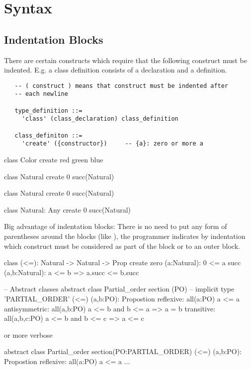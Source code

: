 \section{Syntax}

\subsection{Indentation Blocks}

There are certain constructs which require that the following construct must
be indented. E.g. a class definition consists of a declaration and a
definition.

{\small
\begin{verbatim}
   -- ( construct ) means that construct must be indented after
   -- each newline

   type_definition ::=
     'class' (class_declaration) class_definition

   class_definiton ::=
     'create' ({constructor})     -- {a}: zero or more a
\end{verbatim}
}


\begin{alba}
  class Color create red green blue

  class Natural create 0 succ(Natural)

  class Natural create
    0
    succ(Natural)

  class
    Natural: Any
  create
    0
    succ(Natural)
\end{alba}


Big advantage of indentation blocks: There is no need to put any form of
parentheses around the blocks (like ), the programmer
indicates by indentation which construct must be considered as part of the
block or to an outer block.


\begin{alba}
  class
    (<=): Natural -> Natural -> Prop
  create
    zero (a:Natural): 0 <= a
    succ (a,b:Natural): a <= b  =>  a.succ <= b.succ
\end{alba}



\begin{alba}
  -- Abstract classes
  abstract class Partial_order section (PO)  -- implicit type 'PARTIAL_ORDER'
    (<=) (a,b:PO): Propostion
    reflexive: all(a:PO)
      a <= a
    antisymmetric: all(a,b:PO)
      a <= b  and  b <= a
      =>  a = b
    transitive: all(a,b,c:PO)
      a <= b and b <= c
      => a <= c
\end{alba}
%
or more verbose
\begin{alba}
  abstract class
    Partial_order
  section(PO:PARTIAL_ORDER)
    (<=) (a,b:PO): Propostion
    reflexive: all(a:PO)
      a <= a
    ...
\end{alba}

